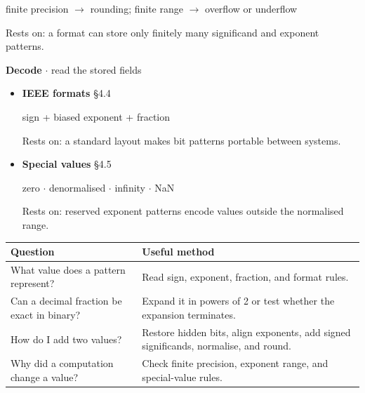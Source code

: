 \documentclass[11pt]{article}
\begin{document}
\begin{keepsection}
\begin{itemize}
finite precision \ensuremath{\to} rounding; finite range \ensuremath{\to} overflow or underflow

Rests on: a format can store only finitely many significand and exponent patterns.
\end{itemize}

\textbf{Decode} \ensuremath{\cdot} read the stored fields

\begin{itemize}
\item {}
\textbf{IEEE formats} \hfill{\small\color{FAUblue}§4.4}

sign + biased exponent + fraction

Rests on: a standard layout makes bit patterns portable between systems.
\item {}
\textbf{Special values} \hfill{\small\color{FAUblue}§4.5}

zero \ensuremath{\cdot} denormalised \ensuremath{\cdot} infinity \ensuremath{\cdot} NaN

Rests on: reserved exponent patterns encode values outside the normalised range.
\end{itemize}

\begin{center}\small\begin{tabularx}{\linewidth}{>{\raggedright\arraybackslash}X>{\raggedright\arraybackslash}X}\toprule
\textbf{Question} & \textbf{Useful method} \\ \midrule
What value does a pattern represent? & Read sign, exponent, fraction, and format rules. \\
Can a decimal fraction be exact in binary? & Expand it in powers of 2 or test whether the expansion terminates. \\
How do I add two values? & Restore hidden bits, align exponents, add signed significands, normalise, and round. \\
Why did a computation change a value? & Check finite precision, exponent range, and special-value rules. \\
\bottomrule\end{tabularx}\end{center}
\end{keepsection}
\end{document}
